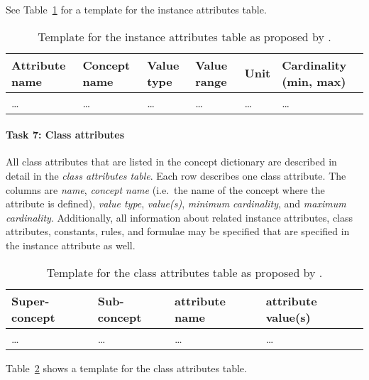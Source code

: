 See Table~\ref{table:methontology_example_instance_attributes} for a template for the instance attributes table.

\begin{table}
\centering
\begin{tabular}{|p{}|p{}|p{}|p{}|p{}|p{}|}
  \hline
  \textbf{Attribute name} & \textbf{Concept name} & \textbf{Value type} & \textbf{Value range} & \textbf{Unit} & \textbf{Cardinality} (min, max)\\
  \hline\hline
  … & … & … & … & … & … \\
  \hline
\end{tabular}
\caption[Template for the instance attributes table]{Template for the instance attributes table as proposed by \methontology.}
\label{table:methontology_example_instance_attributes}
\end{table}

\paragraph{Task 7: Class attributes}

All class attributes that are listed in the concept dictionary are described in detail in the \emph{class attributes table}. Each row describes one class attribute. The columns are \emph{name}, \emph{concept name} (i.e.\ the name of the concept where the attribute is defined), \emph{value type}, \emph{value(s)}, \emph{minimum cardinality}, and \emph{maximum cardinality}. Additionally, all information about related instance attributes, class attributes, constants, rules, and formulae may be specified that are specified in the instance attribute as well.

\begin{table}
\centering
\begin{tabular}{|p{}|p{}|p{}|p{}|}
  \hline
  \textbf{Super-concept} & \textbf{Sub-concept} & \textbf{attribute name} & \textbf{attribute value(s)} \\
  \hline\hline
  … & … & … & … \\
  \hline
\end{tabular}
\caption[Template for the class attributes table]{Template for the class attributes table as proposed by \methontology.}
\label{table:methontology_example_class_attributes}
\end{table}

Table~\ref{table:methontology_example_class_attributes} shows a template for the class attributes table.

